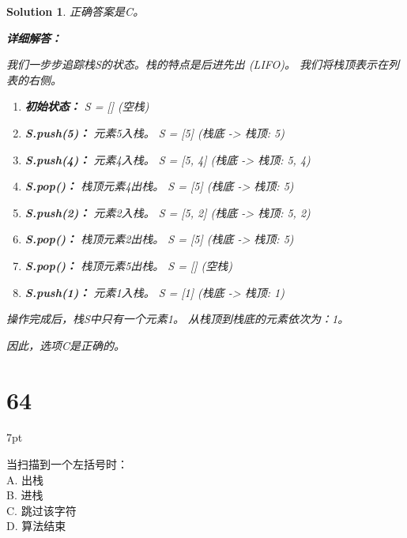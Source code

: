 \documentclass[UTF8]{report}
\newtheorem{solution}{Solution}
\theoremstyle{MyLineTheoremStyle} %
\theoremstyle{MyBlockTheoremStyle} %
\theoremstyle{MySubsubsectionStyle} %
\newenvironment{graybox}{%
        \def\FrameCommand{%
        \hspace{1pt}%
        {\color{gray}\small \vrule width 2pt}%
        {\color{graybox_color}\vrule width 4pt}%
        \colorbox{graybox_color}%
        }%
        \MakeFramed{\advance\hsize-\width\FrameRestore}%
        \noindent\hspace{-4.55pt}%
        \begin{adjustwidth}{}{7pt}%
        \vspace{2pt}\vspace{2pt}%
        }
        {%
        \vspace{2pt}\end{adjustwidth}\endMakeFramed%
        }
\begin{document}
\begin{solution}
正确答案是C。

\textbf{详细解答：}

我们一步步追踪栈S的状态。栈的特点是后进先出 (LIFO)。
我们将栈顶表示在列表的右侧。

\begin{enumerate}
    \item \textbf{初始状态：} S = [] (空栈)
    \item \textbf{S.push(5)：} 元素5入栈。
          S = [5]
          (栈底 -> 栈顶: 5)
    \item \textbf{S.push(4)：} 元素4入栈。
          S = [5, 4]
          (栈底 -> 栈顶: 5, 4)
    \item \textbf{S.pop()：} 栈顶元素4出栈。
          S = [5]
          (栈底 -> 栈顶: 5)
    \item \textbf{S.push(2)：} 元素2入栈。
          S = [5, 2]
          (栈底 -> 栈顶: 5, 2)
    \item \textbf{S.pop()：} 栈顶元素2出栈。
          S = [5]
          (栈底 -> 栈顶: 5)
    \item \textbf{S.pop()：} 栈顶元素5出栈。
          S = [] (空栈)
    \item \textbf{S.push(1)：} 元素1入栈。
          S = [1]
          (栈底 -> 栈顶: 1)
\end{enumerate}
操作完成后，栈S中只有一个元素1。
从栈顶到栈底的元素依次为：1。

因此，选项C是正确的。
\end{solution}


\section*{64}
\begin{graybox}
当扫描到一个左括号时：\\
A. 出栈 \\
B. 进栈 \\
C. 跳过该字符 \\
D. 算法结束
\end{graybox}
\end{document}
